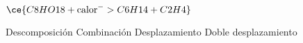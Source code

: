 $\ce{C8HO18  +  \text{calor} ^ -> C6H14 + C2H4}$

\begin{choices}
    \CorrectChoice Descomposición
    \choice Combinación
    \choice Desplazamiento
    \choice Doble desplazamiento
\end{choices}